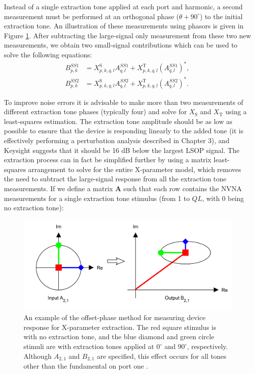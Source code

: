 \documentclass[../thesis/thesis.tex]{subfiles}
\begin{document}
Instead of a single extraction tone applied at each port and harmonic, a second measurement must be performed at an orthogonal phase ($\theta+90^{\circ}$) to the initial extraction tone. An illustration of these measurements using phasors is given in Figure \ref{ch5_fig_extract}. After subtracting the large-signal only measurement from these two new measurements, we obtain two small-signal contributions which can be used to solve the following equations:
\begin{align}
	B^{SS1}_{p,k} &= X^\textrm{S}_{p,k,q,l}A^{SS1}_{q,l} + X^\textrm{T}_{p,k,q,l}(A^{SS1}_{q,l})^*, \\
	B^{SS2}_{p,k} &= X^\textrm{S}_{p,k,q,l}A^{SS2}_{q,l} + X^\textrm{T}_{p,k,q,l}(A^{SS2}_{q,l})^*.
\end{align}

To improve noise errors it is advisable to make more than two measurements of different extraction tone phases (typically four) and solve for $X_\textrm{S}$ and $X_\textrm{T}$ using a least-squares estimation. The extraction tone amplitude should be as low as possible to ensure that the device is responding linearly to the added tone (it is effectively performing a perturbation analysis described in Chapter 3), and Keysight suggests that it should be 16 dB below the largest LSOP signal. The extraction process can in fact be simplified further by using a matrix least-squares arrangement to solve for the entire X-parameter model, which removes the need to subtract the large-signal response from all the extraction tone measurements. If we define a matrix $\bm{A}$ such that each row contains the NVNA measurements for a single extraction tone stimulus (from 1 to $QL$, with 0 being no extraction tone):

\begin{figure}
	\centering
	\includegraphics[width=\textwidth]{extract}
	\caption[Offset-phase X-parameter extraction procedure.]{An example of the offset-phase method for measuring device response for X-parameter extraction. The red square stimulus is with no extraction tone, and the blue diamond and green circle stimuli are with extraction tones applied at $0^{\circ}$ and $90^{\circ}$, respectively. Although $A_{2,1}$ and $B_{2,1}$ are specified, this effect occurs for all tones other than the fundamental on port one \cite{Verspecht_2006}.}
	\label{ch5_fig_extract}
\end{figure}
\end{document}
